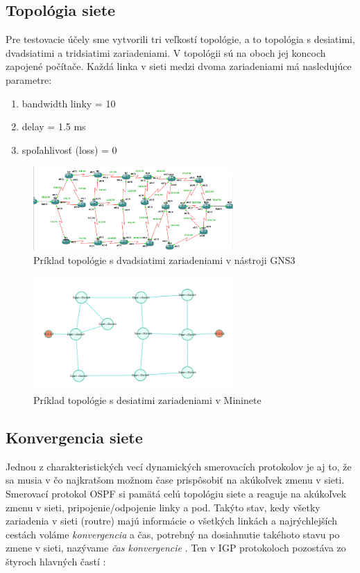 \documentclass[conference]{IEEEtran}
\begin{document}
\subsection{Topológia siete \label{topo}}

Pre testovacie účely sme vytvorili tri veľkostí topológie, a to topológia s desiatimi, dvadsiatimi a tridsiatimi zariadeniami. V topológii sú na oboch jej koncoch zapojené počítače. Každá linka v sieti medzi dvoma zariadeniami má nasledujúce parametre:

\begin{enumerate}
\item{bandwidth linky = 10}
\item{delay = 1.5 ms}
\item{spoľahlivosť (loss) = 0}
\end{enumerate}

\begin{figure}[h!]
\centering
\includegraphics[width=3in]{../img/topology}
\caption{Príklad topológie s dvadsiatimi zariadeniami v nástroji GNS3}
\end{figure}

\begin{figure}[h!]
\centering
\includegraphics[width=3in]{../img/topologySDN}
\caption{Príklad topológie s desiatimi zariadeniami v Mininete}
\end{figure}

\subsection{Konvergencia siete}

Jednou z charakteristických vecí dynamických smerovacích protokolov je aj to, že sa musia v čo najkratšom možnom čase prispôsobiť na akúkoľvek zmenu v sieti. Smerovací protokol OSPF si pamätá celú topológiu siete a reaguje na akúkoľvek zmenu v sieti, pripojenie/odpojenie linky a pod. Takýto stav, kedy všetky zariadenia v sieti (routre) majú informácie o všetkých linkách a najrýchlejších cestách voláme \textit{konvergencia} a čas, potrebný na dosiahnutie takéhoto stavu po zmene v sieti, nazývame \textit{čas konvergencie} \cite{seventh}.  
Ten v IGP protokoloch pozostáva zo štyroch hlavných častí \cite{eigth}: 
\end{document}
